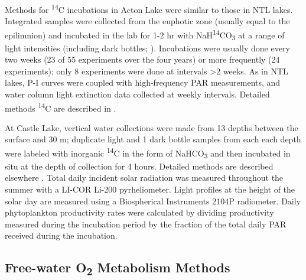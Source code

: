 \documentclass[12pt, oneside]{article}
\begin{document}
Methods for \textsuperscript{14}C incubations in Acton Lake were similar to those in NTL lakes. Integrated samples were collected from the euphotic zone (usually equal to the epilimnion) and incubated in the lab for 1-2 hr with NaH\textsuperscript{14}CO\textsubscript{3} at a range of light intensities (including dark bottles; \citealt{fee1990computer}). Incubations were usually done every two weeks (23 of 55 experiments over the four years) or more frequently (24 experiments); only 8 experiments were done at intervals >2 weeks. As in NTL lakes, P-I curves were coupled with high-frequency PAR measurements, and water column light extinction data collected at weekly intervals. Detailed methods \textsuperscript{14}C are described in \citet{Knoll_Vanni_Renwick_2003}. 

At Castle Lake, vertical water collections were made from 13 depths between the surface and 30 m; duplicate light and 1 dark bottle samples from each each depth were labeled with inorganic \textsuperscript{14}C in the form of NaHCO\textsubscript{3} and then incubated in situ at the depth of collection for 4 hours. Detailed methods are described elsewhere \citep{Goldman_Mason_Wood_1963, Goldman_1968}. Total daily incident solar radiation was measured throughout the summer with a LI-COR Li-200 pyrheliometer. Light profiles at the height of the solar day are measured using a Biospherical Instruments 2104P radiometer. Daily phytoplankton productivity rates were calculated by dividing productivity measured during the incubation period by the fraction of the total daily PAR received during the incubation.

\subsection*{Free-water O\textsubscript{2} Metabolism Methods}
\end{document}
